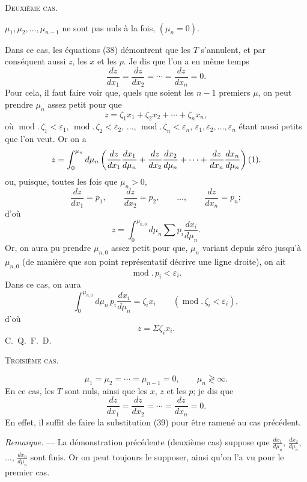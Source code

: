 \documentclass[11pt]{article}
\begin{document}
\begin{center}
{\scshape Deuxième cas.}
\end{center}

$\mu_1,\mu_2,\ldots,\mu_{n-1}$ ne sont pas nuls à la fois, $(\mu_n=0)$.

Dans ce cas, les équations (38) démontrent que les $T$ s’annulent, et par conséquent aussi $z$, les $x$ et les $p$. Je dis que l’on a en même temps
\[
\frac{dz}{dx_1}=\frac{dz}{dx_2}=\cdots=\frac{dz}{dx_n}=0.
\]
Pour cela, il faut faire voir que, quels que soient les $n-1$ premiers $\mu$, on peut prendre $\mu_n$ assez petit pour que
\[
z=\zeta_1x_1+\zeta_2x_2+\cdots+\zeta_nx_n,
\]
où $\operatorname{mod}.\,\zeta_1<\varepsilon_1$, $\operatorname{mod}.\,\zeta_2<\varepsilon_2$, $\ldots$, $\operatorname{mod}.\,\zeta_n<\varepsilon_n$, $\varepsilon_1,\varepsilon_2,\ldots,\varepsilon_n$ étant aussi petits que l’on veut. Or on a
\[
z=\int_0^{\mu_n}d\mu_n\left(\frac{dz}{dx_1}\frac{dx_1}{d\mu_n}+\frac{dz}{dx_2}\frac{dx_2}{d\mu_n}+\cdots+\frac{dz}{dx_n}\frac{dx_n}{d\mu_n}\right)\textup{(1)}.
\]
\begingroup
\renewcommand{\thefootnote}{(1)}
\endgroup
ou, puisque, toutes les fois que $\mu_n>0$,
\[
\frac{dz}{dx_1}=p_1,
\qquad
\frac{dz}{dx_2}=p_2,
\qquad \ldots,
\qquad
\frac{dz}{dx_n}=p_n;
\]
d’où
\[
z=\int_0^{\mu_{n,0}}d\mu_n\sum p_i\frac{dx_i}{d\mu_n}.
\]
Or, on aura pu prendre $\mu_{n,0}$ assez petit pour que, $\mu_n$ variant depuis zéro jusqu’à $\mu_{n,0}$ (de manière que son point représentatif décrive une ligne droite), on ait
\[
\operatorname{mod}.\,p_i<\varepsilon_i.
\]
Dans ce cas, on aura
\[
\int_0^{\mu_{n,0}}d\mu_n\,p_i\frac{dx_i}{d\mu_n}=\zeta_i x_i
\qquad(\operatorname{mod}.\,\zeta_i<\varepsilon_i),
\]
d’où
\[
z=\Sigma\zeta_i x_i.
\]
\hfill\mbox{C. Q. F. D.}

\begin{center}
{\scshape Troisième cas.}
\end{center}
\[
\mu_1=\mu_2=\cdots=\mu_{n-1}=0,
\qquad
\mu_n\gtrless\infty.
\]
En ce cas, les $T$ sont nuls, ainsi que les $x$, $z$ et les $p$; je dis que
\[
\frac{dz}{dx_1}=\frac{dz}{dx_2}=\cdots=\frac{dz}{dx_n}=0.
\]
En effet, il suffit de faire la substitution (39) pour être ramené au cas précédent.

\emph{Remarque.} --- La démonstration précédente (deuxième cas) suppose que $\frac{dx_1}{d\mu_n}$, $\frac{dx_2}{d\mu_n}$, $\ldots$, $\frac{dx_n}{d\mu_n}$ sont finis. Or on peut toujours le supposer, ainsi qu’on l’a vu pour le premier cas.
\end{document}
